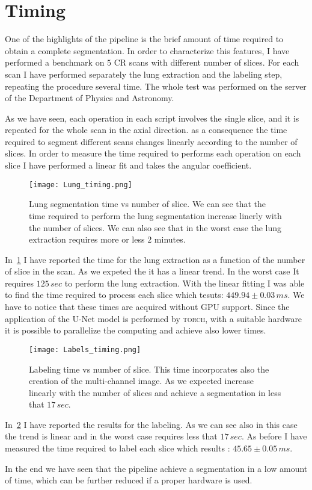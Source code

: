 \documentclass{standalone}
\begin{document}
	\section{Timing}
	
	One of the highlights of the pipeline is the brief amount of time required to obtain a complete segmentation. In order to characterize this features, I have performed a benchmark on $5$ CR scans with different number of slices. For each scan I have performed separately the lung extraction and the labeling step, repeating the procedure several time. The whole test was performed on the server of the Department of Physics and Astronomy. 
	
	As we have seen, each operation in each script involves the single slice, and it is repeated for the whole scan in the axial direction. as a consequence the time required to segment different scans changes linearly according to the number of slices. In order to measure the time required to performs each operation on each slice I have performed a linear fit and takes the angular coefficient. 
	
	\begin{figure}
		\centering
			\texttt{[image: Lung\_timing.png]}
			\caption{Lung segmentation time vs number of slice. We can see that the time required to perform the lung segmentation increase linerly with the number of slices. We can also see that in the worst case the lung extraction requires more or less $2$ minutes.}\label{fig:LungTime}
	\end{figure}

	In \figurename\,\ref{fig:LungTime} I have reported the time for the lung extraction as a function of the number of slice in the scan. As we expeted the it has a linear trend. In the worst case It requires $125\,sec$ to perform the lung extraction. With the linear fitting I was able to find the time required to process each slice which tesuts: $449.94\pm 0.03\,ms$. We have to notice that these times are acquired without GPU support. Since the application of the U-Net model is performed by \textsc{torch}, with a suitable hardware it is possible to parallelize the computing and achieve also lower times.
	
		
	\begin{figure}
		\centering
		\texttt{[image: Labels\_timing.png]}
		\caption{Labeling time vs number of slice. This time incorporates also the creation of the multi-channel image. As we expected increase linearly with the number of slices and achieve a segmentation in less that $17\,sec$.}\label{fig:LabTime}
	\end{figure}

	In \figurename\,\ref{fig:LabTime} I have reported the results for the labeling. As we can see also in this case the trend is linear and in the worst case requires less that $17\,sec$. As before I have measured the time required to label each slice which results : $45.65\pm0.05\,ms$. 
	
	In the end we have seen that the pipeline achieve a segmentation in a low amount of time, which can be further reduced if a proper hardware is used. 
	 
	 
	 
\end{document}
